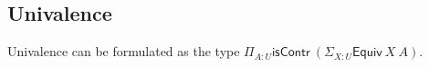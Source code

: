 \documentclass[10pt,a4paper]{article}
\newcommand{\isContr}{\mathsf{isContr}}
\newcommand{\Equiv}{\mathsf{Equiv}}
\begin{document}
\subsection*{Univalence}

 Univalence can be formulated as the type $\Pi_{A:U}\isContr~(\Sigma_{X:U}\Equiv~X~A)$.



\end{document}
